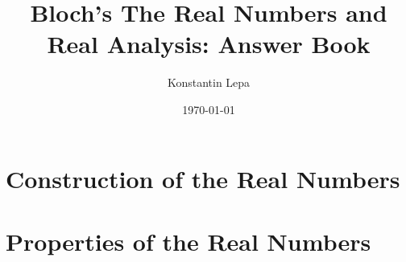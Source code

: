 \documentclass[reqno]{amsbook}
\title{Bloch's The Real Numbers and Real Analysis: Answer Book}
\author{Konstantin Lepa}
\date{\today}
\begin{document}
\begin{preview}

	\maketitle

	\Newpage
	\chapter{Construction of the Real Numbers}

	\Newpage
	

	\Newpage
	

	\Newpage
	

	\Newpage
	

	\Newpage
	

	\Newpage
	

	\Newpage
	


	\Newpage
	\chapter{Properties of the Real Numbers}

	\addtocounter{section}{4}

	\Newpage
	


	\Newpage
	\begin{thebibliography}{99}
	\end{thebibliography}

\end{preview}
\end{document}
